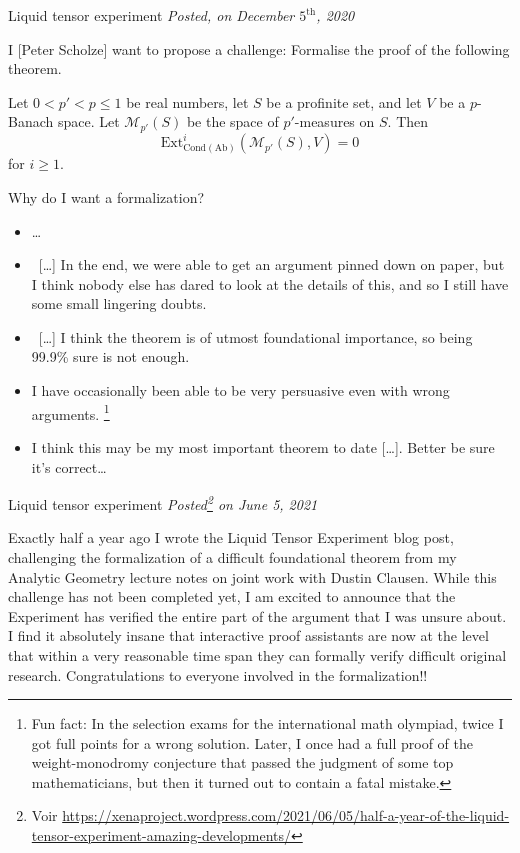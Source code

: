 \documentclass[10pt]{beamer}
\begin{document}
\begin{frame}
{\Large Liquid tensor experiment}
\emph{Posted, on December $5^\text{th}$, 2020}
\vspace{.5cm}

{I \textcolor{arancio}{[Peter Scholze]} want to propose a challenge: Formalise the proof of the following theorem.

\begin{theorem}[Clausen--S.] Let $0<p'<p\leq 1$ be real numbers, let $S$ be a profinite set, and let $V$ be a $p$-Banach space. Let $\mathcal M_{p'}(S)$ be the space of $p'$-measures on $S$. Then
\[
\mathrm{Ext}^i_{\mathrm{Cond}(\mathrm{Ab})}(\mathcal M_{p'}(S),V)=0
\]
for $i\geq 1$.
\end{theorem}}
\pause
{}
{\vspace{.75cm}
Why do I want a formalization?}
\pause
{}
{\begin{itemize}
\item \dots
\item ~[\dots] In the end, we were able to get an argument pinned down on paper, but I think nobody else has dared to look at the details of this, and so I still have some small lingering doubts.
\item ~[\dots] I think the theorem is of utmost foundational importance, so being 99.9\% sure is not enough.
\item I have occasionally been able to be very persuasive even with wrong arguments. \footnote{Fun fact: In the selection exams for the international math olympiad, twice I got full points for a wrong solution. Later, I once had a full proof of the weight-monodromy conjecture that passed the judgment of some top mathematicians, but then it turned out to contain a fatal mistake.}
\item I think this may be my most important theorem to date [\dots]. Better be sure it’s correct\dots
\end{itemize}}
\end{frame}
\begin{frame}
{\Large Liquid tensor experiment}
\emph{Posted\footnote{Voir \url{https://xenaproject.wordpress.com/2021/06/05/half-a-year-of-the-liquid-tensor-experiment-amazing-developments/}} on June 5, 2021}
\vspace{.5cm}

Exactly half a year ago I wrote the Liquid Tensor Experiment blog post, challenging the formalization of a difficult foundational theorem from my Analytic Geometry lecture notes on joint work with Dustin Clausen. While this challenge has not been completed yet, I am excited to announce that \textcolor{arancio}{the Experiment has verified the entire part of the argument that I was unsure about}. I find it absolutely insane that \textcolor{arancio}{interactive proof assistants are now at the level that within a very reasonable time span they can formally verify difficult original research}. Congratulations to everyone involved in the formalization!!
\end{frame}
\end{document}
